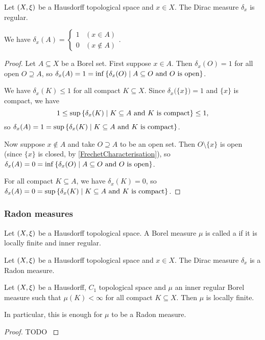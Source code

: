 \begin{proposition}
Let $\sSet{X, \xi}$ be a Hausdorff topological space and $x\in X$. The Dirac measure $\delta_x$ is regular.
\end{proposition}
We have $\delta_x(A) = \begin{cases}
1 & (x\in A) \\ 0 & (x\notin A)
\end{cases}$.
\begin{proof}
Let $A\subseteq X$ be a Borel set. First suppose $x\in A$. Then $\delta_x(O) = 1$ for all open $O\supseteq A$, so $\delta_x(A) = 1 = \inf\setbuilder{\delta_x(O)}{\text{$A\subseteq O$ and $O$ is open}}$.

We have $\delta_x(K) \leq 1$ for all compact $K\subseteq X$. Since $\delta_x\big(\{x\}\big) = 1$ and $\{x\}$ is compact, we have
\[ 1 \leq \sup\setbuilder{\delta_x(K)}{\text{$K\subseteq A$ and $K$ is compact}} \leq 1, \]
so $\delta_x(A) = 1 = \sup\setbuilder{\delta_x(K)}{\text{$K\subseteq A$ and $K$ is compact}}$.

Now suppose $x\notin A$ and take $O \supseteq A$ to be an open set. Then $O\setminus\{x\}$ is open (since $\{x\}$ is closed, by \ref{FrechetCharacterisation}), so $\delta_x(A) = 0 = \inf\setbuilder{\delta_x(O)}{\text{$A\subseteq O$ and $O$ is open}}$.

For all compact $K\subseteq A$, we have $\delta_x(K) = 0$, so $\delta_x(A) = 0 = \sup\setbuilder{\delta_x(K)}{\text{$K\subseteq A$ and $K$ is compact}}$.
\end{proof}


\subsubsection{Radon measures}
\begin{definition}
Let $\sSet{X, \xi}$ be a Hausdorff topological space. A Borel measure $\mu$ is called a  if it is locally finite and inner regular.
\end{definition}

\begin{example}
Let $\sSet{X, \xi}$ be a Hausdorff topological space and $x\in X$. The Dirac measure $\delta_x$ is a Radon measure.
\end{example}

\begin{proposition}
Let $\sSet{X, \xi}$ be a Hausdorff, $C_1$ topological space and $\mu$ an inner regular Borel measure such that $\mu(K) < \infty$ for all compact $K\subseteq X$. Then $\mu$ is locally finite.
\end{proposition}
In particular, this is enough for $\mu$ to be a Radon measure.
\begin{proof}
TODO \cite{Bauer+2001}
\end{proof}


